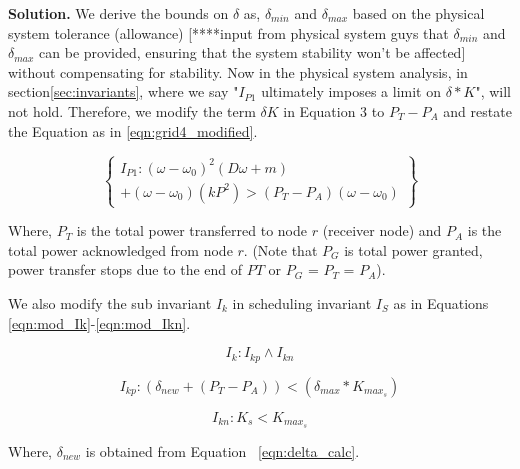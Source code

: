 {\bf Solution. }We derive the bounds on $\delta$ as, $\delta_{min}$ and $\delta_{max}$ based on the physical system tolerance
(allowance) [****input from physical system guys that $\delta_{min}$ and $\delta_{max}$ can be provided, ensuring that the 
system stability won't be affected] without compensating for stability. Now in the physical system analysis, in section\ref{sec:invariants},
where we say "$I_{P1}$ ultimately imposes a limit on $\delta * K$", will not hold. Therefore, we modify the term $\delta K$ 
in Equation 3 to $P_T - P_A$ and restate the Equation as in \ref{eqn:grid4_modified}. 

\begin{equation}
\left\{
\begin{matrix}
I_{P1}: (\omega - \omega_0)^2 \left(D\omega + m \right) \\ + (\omega - \omega_0)(kP^2)  > (P_T - P_A)(\omega - \omega_0)
\end{matrix}
\right\}
\label{eqn:grid4_modified}
\end{equation}

Where, $P_T$ is the total power transferred to node $r$ (receiver node) and 
$P_A$ is the total power acknowledged from node $r$. (Note that $P_G$ is total 
power granted, power transfer stops due to the end of $PT$ or $P_G$ = $P_T$ = $P_A$).

We also modify the sub invariant $I_k$ in scheduling invariant $I_S$ as in
Equations \ref{eqn:mod_Ik}-\ref{eqn:mod_Ikn}.


\begin{equation}
I_k: I_{kp} \wedge I_{kn}
\label{eqn:mod_Ik}
\end{equation}	

\begin{equation}
I_{kp}: (\delta_{new} + (P_T - P_A)) < (\delta_{max}*K_{max_s})
\label{eqn:mod_Ikp}
\end{equation}	

\begin{equation}
I_{kn}: K_s < K_{max_s}
\label{eqn:mod_Ikn}
\end{equation}	


Where, $\delta_{new}$ is obtained from Equation ~\ref{eqn:delta_calc}.






